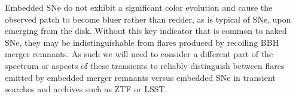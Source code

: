 Embedded SNe do not exhibit a significant color evolution and cause the observed patch to become bluer rather than redder, as is typical of SNe, upon emerging from the disk.
Without this key indicator that is common to naked SNe, they may be indistinguishable from flares produced by recoiling BBH merger remnants.
As such we will need to consider a different part of the spectrum or aspects of these transients to reliably distinguish between flares emitted by embedded merger remnants versus embedded SNe in transient searches and archives such as ZTF or LSST.
